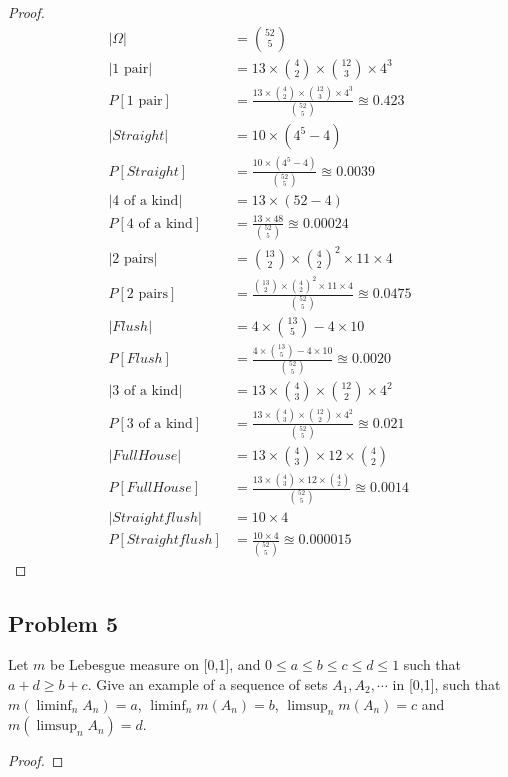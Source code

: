\documentclass[letterpaper, 11pt]{article}
\newcommand{\1}{\mathds{1}}	%
\theoremstyle{definition}
\begin{document}
\begin{proof}
    \begin{align*}{}{}
        |\Omega|&=\binom{52}{5}  \\
        |1\text{ pair}|&=13\times\binom{4}{2}\times\binom{12}{3}\times4^3  \\
        P[1\text{ pair}]&=\frac{13\times\binom{4}{2}\times\binom{12}{3}\times4^3}{\binom{52}{5}}\approxeq 0.423\\[1ex]
           |Straight|&=10\times(4^5-4)  \\
           P[Straight]&=\frac{10\times(4^5-4)}{\binom{52}{5}}\approxeq 0.0039\\[1ex]
           |4\text{ of a kind}|&=13\times(52-4)  \\
              P[4\text{ of a kind}]&=\frac{13\times48}{\binom{52}{5}}\approxeq 0.00024\\[1ex]
              |2\text{ pairs}|&=\binom{13}{2}\times\binom{4}{2}^2\times11\times4  \\
              P[2\text{ pairs}]&=\frac{\binom{13}{2}\times\binom{4}{2}^2\times11\times4}{\binom{52}{5}}\approxeq 0.0475\\[1ex]
                |Flush|&=4\times\binom{13}{5} -4\times10 \\
                P[Flush]&=\frac{4\times\binom{13}{5} -4\times10}{\binom{52}{5}}\approxeq 0.0020\\[1ex]
              |3\text{ of a kind}|&=13\times\binom{4}{3}\times\binom{12}{2}\times4^2  \\
                P[3\text{ of a kind}]&=\frac{13\times\binom{4}{3}\times\binom{12}{2}\times4^2}{\binom{52}{5}}\approxeq 0.021\\[1ex]
           |Full House|&=13\times\binom{4}{3}\times12\times\binom{4}{2}  \\
           P[Full House]&=\frac{13\times\binom{4}{3}\times12\times\binom{4}{2}}{\binom{52}{5}}\approxeq 0.0014\\[1ex]
           |Straight flush|&=10\times 4\\
           P[Straight flush]&=\frac{10\times 4}{\binom{52}{5}}\approxeq 0.000015
        \end{align*} 
\end{proof}
\subsection*{Problem 5}
Let $m$ be Lebesgue measure on [0,1], and $0 \leq a \leq b \leq c \leq d \leq 1$ such that $a+d \geq b+c$. Give an example of a sequence of sets $A_1, A_2, \cdots$ in [0,1], such that $m(\liminf_n A_n) = a$, $\liminf_n m(A_n) = b$, $\limsup_n m(A_n) = c$ and $m(\limsup_n A_n) = d$.
\begin{proof}
    
\end{proof}
\end{document}
